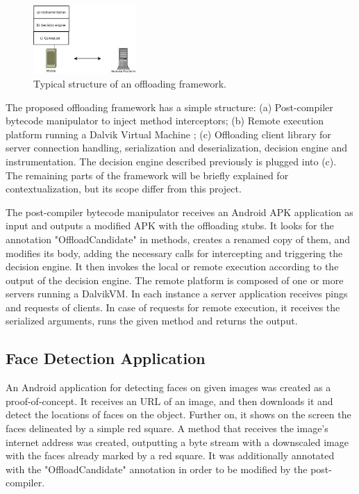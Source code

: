 \documentclass[10pt, conference, letterpaper]{IEEEtran}
\begin{document}
  \begin{figure}[htb]
  \centering
  \includegraphics[width=0.35\textwidth]{imgs/system.jpeg}
  \caption{Typical structure of an offloading framework.}
  \label{fig:systemDiagram}
\end{figure}

  The proposed offloading framework has a simple structure: (a) Post-compiler bytecode manipulator to inject method interceptors; (b) Remote execution platform running a Dalvik Virtual Machine \cite{ehringer2010dalvik}; (c) Offloading client library for server connection handling, serialization and deserialization, decision engine and instrumentation.  The decision engine described previously is plugged into (c). The remaining parts of the framework will be briefly explained for contextualization, but its scope differ from this project.

  The post-compiler bytecode manipulator receives an Android APK application as input and outputs a modified APK with the offloading stubs. It looks for the annotation "OffloadCandidate" in methods, creates a renamed copy of them, and modifies its body, adding the necessary calls for intercepting and triggering the decision engine. It then invokes the local or remote execution according to the output of the decision engine. The remote platform is composed of one or more servers running a DalvikVM. In each instance a server application receives pings and requests of clients. In case of requests for remote execution, it receives the serialized arguments, runs the given method and returns the output.

\subsection{Face Detection Application}
  
  An Android application for detecting faces on given images was created as a proof-of-concept. It receives an URL of an image, and then downloads it and detect the locations of faces on the object. Further on, it shows on the screen the faces delineated by a simple red square. A method that receives the image's internet address was created, outputting a byte stream with a downscaled image with the faces already marked by a red square. It was additionally annotated with the  "OffloadCandidate" annotation in order to be modified by the post-compiler.
\end{document}
